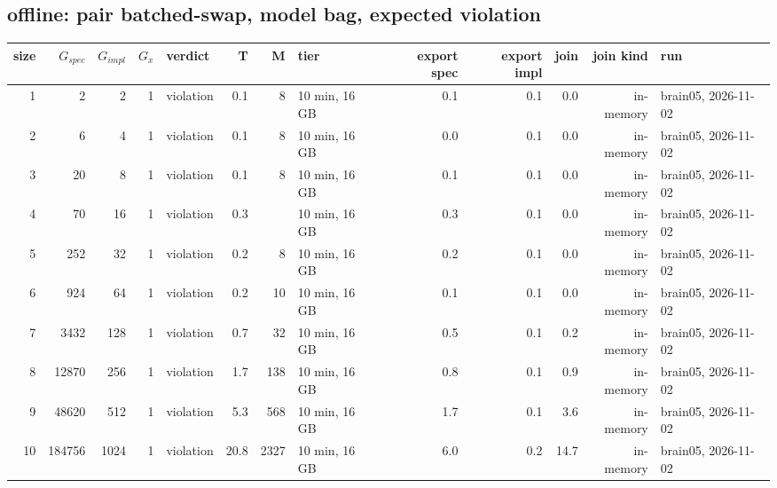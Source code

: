 \documentclass[10pt]{article}
\begin{document}
\subsection*{offline: pair \textsf{batched-swap}, model bag, expected violation}
\begin{longtable}{@{}rrrrlrrlrrrrl@{}}
\toprule
size & $G_{\mathit{spec}}$ & $G_{\mathit{impl}}$ & $G_x$ & verdict & T & M & tier & export spec & export impl & join & join kind & run \\
\midrule
\endhead
\color{red} 1 & 2 & 2 & 1 & violation & 0.1 & 8 & 10 min, 16 GB & 0.1 & 0.1 & 0.0 & in-memory & brain05, 2026-11-02 \\
\color{red} 2 & 6 & 4 & 1 & violation & 0.1 & 8 & 10 min, 16 GB & 0.0 & 0.1 & 0.0 & in-memory & brain05, 2026-11-02 \\
\color{red} 3 & 20 & 8 & 1 & violation & 0.1 & 8 & 10 min, 16 GB & 0.1 & 0.1 & 0.0 & in-memory & brain05, 2026-11-02 \\
\color{red} 4 & 70 & 16 & 1 & violation & 0.3 &  & 10 min, 16 GB & 0.3 & 0.1 & 0.0 & in-memory & brain05, 2026-11-02 \\
\color{red} 5 & 252 & 32 & 1 & violation & 0.2 & 8 & 10 min, 16 GB & 0.2 & 0.1 & 0.0 & in-memory & brain05, 2026-11-02 \\
\color{red} 6 & 924 & 64 & 1 & violation & 0.2 & 10 & 10 min, 16 GB & 0.1 & 0.1 & 0.0 & in-memory & brain05, 2026-11-02 \\
\color{red} 7 & 3432 & 128 & 1 & violation & 0.7 & 32 & 10 min, 16 GB & 0.5 & 0.1 & 0.2 & in-memory & brain05, 2026-11-02 \\
\color{red} 8 & 12870 & 256 & 1 & violation & 1.7 & 138 & 10 min, 16 GB & 0.8 & 0.1 & 0.9 & in-memory & brain05, 2026-11-02 \\
\color{red} 9 & 48620 & 512 & 1 & violation & 5.3 & 568 & 10 min, 16 GB & 1.7 & 0.1 & 3.6 & in-memory & brain05, 2026-11-02 \\
\color{red} 10 & 184756 & 1024 & 1 & violation & 20.8 & 2327 & 10 min, 16 GB & 6.0 & 0.2 & 14.7 & in-memory & brain05, 2026-11-02 \\
\bottomrule
\end{longtable}
\end{document}
